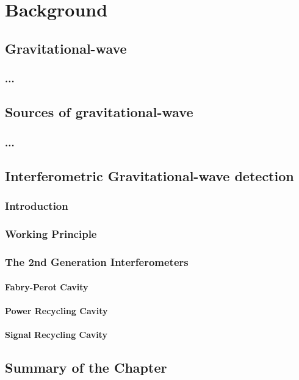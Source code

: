 \chapter{Background}
\section{Gravitational-wave}
\subsection{...}
\section{Sources of gravitational-wave}
\subsection{...}
\section{Interferometric Gravitational-wave detection} \label{sec:13}
\subsection{Introduction}
\subsection{Working Principle}
\subsection{The 2nd Generation Interferometers}
\subsubsection{Fabry-Perot Cavity}
\subsubsection{Power Recycling Cavity}
\subsubsection{Signal Recycling Cavity}
\section{Summary of the Chapter}
